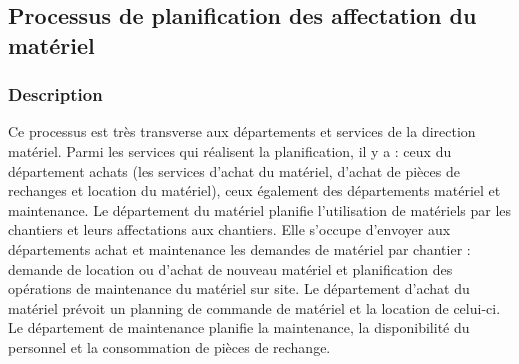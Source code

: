 				
				
				
		\subsection{Processus de planification des affectation du matériel}
				\subsubsection{Description}
				
				Ce processus est très transverse aux départements et services de la direction matériel.
				Parmi les services qui réalisent la planification, il y a : ceux du département achats (les services d'achat du matériel, d'achat de pièces de rechanges et location du matériel), ceux également des départements matériel et maintenance.
				\newline
				Le département du matériel planifie l'utilisation de matériels par les chantiers et leurs affectations aux chantiers. Elle s'occupe d'envoyer aux départements achat et maintenance les demandes de matériel par chantier : demande de location ou d'achat de nouveau matériel et planification des opérations de maintenance du matériel sur site.
				\newline
				Le département d'achat du matériel prévoit un planning de commande de matériel et la location de celui-ci. 
				\newline
				Le département de maintenance planifie la maintenance, la disponibilité du personnel et la consommation de pièces de rechange.
				
				
				
